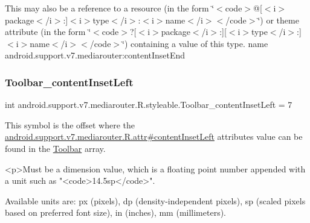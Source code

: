 This may also be a reference to a resource (in the form \char`\"{}$<$code$>$@\mbox{[}$<$i$>$package$<$/i$>$\+:\mbox{]}$<$i$>$type$<$/i$>$\+:$<$i$>$name$<$/i$>$$<$/code$>$\char`\"{}) or theme attribute (in the form \char`\"{}$<$code$>$?\mbox{[}$<$i$>$package$<$/i$>$\+:\mbox{]}\mbox{[}$<$i$>$type$<$/i$>$\+:\mbox{]}$<$i$>$name$<$/i$>$$<$/code$>$\char`\"{}) containing a value of this type.  name android.\+support.\+v7.\+mediarouter\+:content\+Inset\+End \mbox{\label{classandroid_1_1support_1_1v7_1_1mediarouter_1_1R_1_1styleable_a37a31055586c7afd817372e689144033}} 
\subsubsection{\texorpdfstring{Toolbar\+\_\+content\+Inset\+Left}{Toolbar\_contentInsetLeft}}
{\footnotesize\ttfamily int android.\+support.\+v7.\+mediarouter.\+R.\+styleable.\+Toolbar\+\_\+content\+Inset\+Left = 7\hspace{0.3cm}{\ttfamily [static]}}

This symbol is the offset where the \hyperlink{classandroid_1_1support_1_1v7_1_1mediarouter_1_1R_1_1attr_a00da2882f3185a4fb35023d1fa0fb37a}{android.\+support.\+v7.\+mediarouter.\+R.\+attr\#content\+Inset\+Left} attribute\textquotesingle{}s value can be found in the \hyperlink{classandroid_1_1support_1_1v7_1_1mediarouter_1_1R_1_1styleable_a6815cdfaadde30c82b955863af196899}{Toolbar} array.

\begin{DoxyVerb}      <p>Must be a dimension value, which is a floating point number appended with a unit such as "<code>14.5sp</code>".
\end{DoxyVerb}
 Available units are\+: px (pixels), dp (density-\/independent pixels), sp (scaled pixels based on preferred font size), in (inches), mm (millimeters). 

